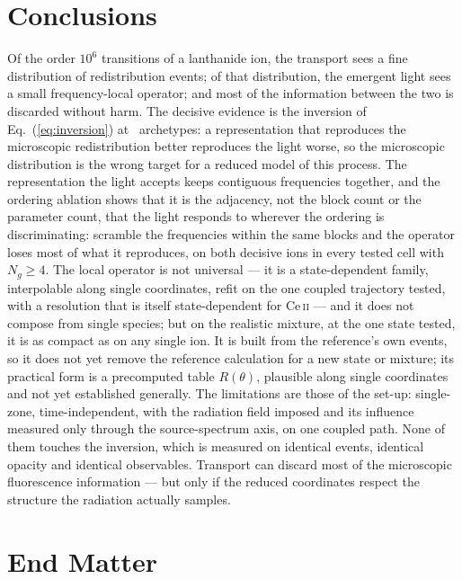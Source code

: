 \documentclass[aps,prl,twocolumn,superscriptaddress,nofootinbib,longbibliography]{revtex4-2}
\begin{document}
\section{Conclusions}
\label{sec:discussion}
Of the order $10^6$ transitions of a lanthanide ion, the transport sees a
fine distribution of redistribution events; of that distribution, the
emergent light sees a small frequency-local operator; and most of the
information between the two is discarded without harm. The decisive
evidence is the inversion of Eq.~(\ref{eq:inversion}) at
\PBContrastK\ archetypes: a representation that reproduces the microscopic
redistribution better reproduces the light worse, so the microscopic
distribution is the wrong target for a reduced model of this process. The
representation the light accepts keeps contiguous frequencies together,
and the ordering ablation shows that it is the adjacency, not the block
count or the parameter count, that the light responds to wherever the
ordering is discriminating: scramble the frequencies within the same
blocks and the operator loses most of what it reproduces, on both decisive
ions in every tested cell with $N_g\ge4$.
The local
operator is not universal --- it is a state-dependent family, interpolable
along single coordinates, refit on the one coupled trajectory tested, with
a resolution that is itself state-dependent for Ce\,\textsc{ii} --- and it
does not compose from single species; but on the realistic mixture, at
the one state tested, it is as compact as on any single ion. It is built
from the reference's own events, so it does not yet remove the reference
calculation for a new state or mixture; its practical form is a
precomputed table $R(\theta)$, plausible along single coordinates and not
yet established generally. The limitations are those of the
set-up: single-zone, time-independent, with the radiation field imposed
and its influence measured only through the source-spectrum axis, on one
coupled path. None of them touches the inversion, which is measured on
identical events, identical opacity and identical observables. Transport
can discard most of the microscopic fluorescence information --- but only
if the reduced coordinates respect the structure the radiation actually
samples.

\section*{End Matter}
\label{sec:endmatter}
\end{document}
